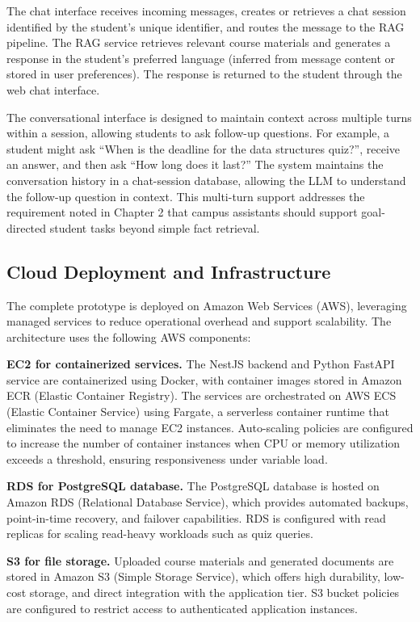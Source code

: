 \documentclass[a4paper,9pt,twocolumn]{extarticle}
\begin{document}
The chat interface receives incoming messages, creates or retrieves a chat session identified by the student's unique identifier, and routes the message to the RAG pipeline. The RAG service retrieves relevant course materials and generates a response in the student's preferred language (inferred from message content or stored in user preferences). The response is returned to the student through the web chat interface.

The conversational interface is designed to maintain context across multiple turns within a session, allowing students to ask follow-up questions. For example, a student might ask ``When is the deadline for the data structures quiz?'', receive an answer, and then ask ``How long does it last?'' The system maintains the conversation history in a chat-session database, allowing the LLM to understand the follow-up question in context. This multi-turn support addresses the requirement noted in Chapter 2 that campus assistants should support goal-directed student tasks beyond simple fact retrieval.

\subsection{Cloud Deployment and Infrastructure}
\label{sec:impl:cloud}

The complete prototype is deployed on Amazon Web Services (AWS), leveraging managed services to reduce operational overhead and support scalability. The architecture uses the following AWS components:

\textbf{EC2 for containerized services.} The NestJS backend and Python FastAPI service are containerized using Docker, with container images stored in Amazon ECR (Elastic Container Registry). The services are orchestrated on AWS ECS (Elastic Container Service) using Fargate, a serverless container runtime that eliminates the need to manage EC2 instances. Auto-scaling policies are configured to increase the number of container instances when CPU or memory utilization exceeds a threshold, ensuring responsiveness under variable load.

\textbf{RDS for PostgreSQL database.} The PostgreSQL database is hosted on Amazon RDS (Relational Database Service), which provides automated backups, point-in-time recovery, and failover capabilities. RDS is configured with read replicas for scaling read-heavy workloads such as quiz queries.

\textbf{S3 for file storage.} Uploaded course materials and generated documents are stored in Amazon S3 (Simple Storage Service), which offers high durability, low-cost storage, and direct integration with the application tier. S3 bucket policies are configured to restrict access to authenticated application instances.
\end{document}
